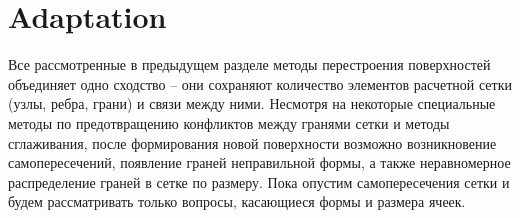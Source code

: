 \documentclass[
11pt,%
tightenlines,%
twoside,%
onecolumn,%
nofloats,%
nobibnotes,%
nofootinbib,%
superscriptaddress,%
noshowpacs,%
centertags]%
{revtex4}
\begin{document}

\section{Adaptation}

Все рассмотренные в предыдущем разделе методы перестроения поверхностей объединяет одно сходство -- они сохраняют количество элементов расчетной сетки (узлы, ребра, грани) и связи между ними.
Несмотря на некоторые специальные методы по предотвращению конфликтов между гранями сетки и методы сглаживания, после формирования новой поверхности возможно возникновение самопересечений, появление граней неправильной формы, а также неравномерное распределение граней в сетке по размеру.
Пока опустим самопересечения сетки и будем рассматривать только вопросы, касающиеся формы и размера ячеек.
\end{document}
